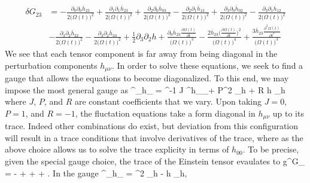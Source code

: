 \documentclass[10pt,letterpaper]{article}
\begin{document}
\begin{align}
	\delta G_{23} &= - \frac{\partial_{0}\partial_{0}\overline{h}_{23}}{2 \bigl(\Omega(t)\bigr)^2} + \frac{\partial_{1}\partial_{1}\overline{h}_{23}}{2 \bigl(\Omega(t)\bigr)^2} + \frac{\partial_{2}\partial_{0}\overline{h}_{03}}{2 \bigl(\Omega(t)\bigr)^2} -  \frac{\partial_{2}\partial_{1}\overline{h}_{13}}{2 \bigl(\Omega(t)\bigr)^2} + \frac{\partial_{3}\partial_{0}\overline{h}_{02}}{2 \bigl(\Omega(t)\bigr)^2} -  \frac{\partial_{3}\partial_{1}\overline{h}_{12}}{2 \bigl(\Omega(t)\bigr)^2}\\
& -  \frac{\partial_{3}\partial_{2}\overline{h}_{22}}{2 \bigl(\Omega(t)\bigr)^2} -  \frac{\partial_{3}\partial_{2}\overline{h}_{33}}{2 \bigl(\Omega(t)\bigr)^2} + \tfrac{1}{2} \partial_{3}\partial_{2}h + \frac{\partial_{0}\overline{h}_{23} \frac{\partial \Omega(t)}{\partial t}}{\bigl(\Omega(t)\bigr)^3} -  \frac{2 \overline{h}_{23} \bigl(\frac{\partial \Omega(t)}{\partial t}\bigr)^2}{\bigl(\Omega(t)\bigr)^4} + \frac{3 \overline{h}_{23} \frac{\partial^{2}\Omega(t)}{\partial t^{2}}}{\bigl(\Omega(t)\bigr)^3}
\end{align}
We see that each tensor component is far away from being diagonal in the perturbation components $h_{\mu\nu}$. In order to solve these equations, we seek to find a gauge that allows the equations to become diagonalized. To this end, we may impose the most general gauge as
\be
	\eta^{\alpha\beta}\pd_{\alpha}h_{\beta\nu} = \Omega^{-1} J \eta^{\alpha\beta}h_{\nu\alpha}\pd_\beta \Omega + P\Omega^2 \pd_\nu h + R \Omega h \pd_\nu h
\ee
where $J$, $P$, and $R$ are constant coefficients that we vary. Upon taking $J = 0$, $P = 1$, and $R = -1$, the fluctation equations take a form diagonal in $h_{\mu\nu}$ up to its trace. Indeed other combinations do exist, but deviation from this configuration will result in a trace conditions that involve derivatives of the trace, where as the above choice allows us to solve the trace explicity in terms of $h_{00}$. To be precise, given the special gauge choice, the trace of the Einstein tensor evaulates to
\be
	g^{\mu\nu}\delta G_{\mu\nu} = -  +  +  + .
\ee 
In the gauge
\be
	\eta^{\alpha\beta}\pd_{\alpha}h_{\beta\nu} = \Omega^2 \pd_\nu h - \Omega h \pd_\nu h,
\end{document}
